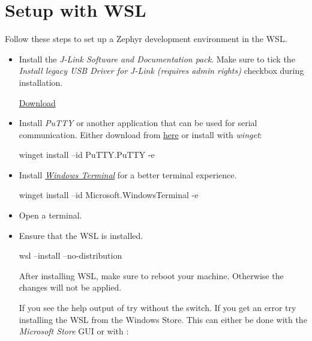 \section{Setup with WSL}

Follow these steps to set up a Zephyr development environment in the WSL.

\begin{itemize}
  \item Install the \emph{J-Link Software and Documentation pack}.
    Make sure to tick the \emph{Install legacy USB Driver for J-Link (requires admin rights)} checkbox during installation.

    \href{https://www.segger.com/downloads/jlink/JLink_Windows_x86_64.exe}{Download}

  \item Install \emph{PuTTY} or another application that can be used for serial
    communication.
    Either download from \href{https://putty.org/}{here} or install with \emph{winget}:

        \begin{monobox}
winget install --id PuTTY.PuTTY -e
\end{monobox}

  \item Install \href{https://aka.ms/terminal}{\emph{Windows Terminal}} for a better terminal experience.

        \begin{monobox}
winget install --id Microsoft.WindowsTerminal -e
\end{monobox}

  \item Open a terminal.

  \item Ensure that the WSL is installed.
        \begin{monobox}
wsl --install --no-distribution
\end{monobox}

    \begin{infobox}
      After installing WSL, make sure to reboot your machine.
      Otherwise the changes will not be applied.
    \end{infobox}

    \begin{infobox}
      If you see the help output of  try without the  switch.
      If you get an error try installing the WSL from the Windows Store.
      This can either be done with the \emph{Microsoft Store} GUI or with :


\end{infobox}
\end{itemize}
